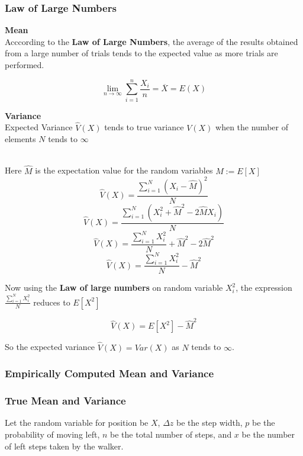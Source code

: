 \documentclass[a4paper]{article}
\begin{document}
\subsubsection{Law of Large Numbers}
\vspace{1em}
{\textbf{Mean}}\\
Acccording to the \textbf{Law of Large Numbers}, the average of the results obtained from a large number of trials tends to the expected value as more trials are performed.

$$\lim_{n \to \infty} \sum_{i=1}^{n} \frac{X_i}{n} = \overline{X} = E(X)$$

{\textbf{Variance}}\\
Expected Variance $\hat{V}(X)$ tends to true variance $V(X)$ when the number of elements $N$ tends to $\infty$ \\\

Here $\hat{M}$ is the expectation value for the random variables $M:= E[X]$\\

$$\hat{V}(X) = \frac{\sum_{i=1}^{N}(X_{i} - \hat{M})^2}{N}$$
$$\hat{V}(X) = \frac{\sum_{i=1}^{N}(X_{i}^2 + \hat{M}^2 - 2\hat{M}X_{i})}{N}$$
$$\hat{V}(X) = \frac{\sum_{i=1}^{N}X_{i}^2}{N} + \hat{M}^2 - 2\hat{M}^2$$
$$\hat{V}(X) = \frac{\sum_{i=1}^{N}X_{i}^2}{N}  - \hat{M}^2$$

Now using the \textbf{Law of large numbers} on random variable $X_{i}^2$, the expression 
$\frac{\sum_{i=1}^{N}X_{i}^2}{N}$ reduces to $E[X^2]$

$$\hat{V}(X) = E[X^2]  - \hat{M}^2$$


So the expected variance $\hat{V}(X) = Var(X)$ as $N$ tends to $\infty$.

\subsubsection{Empirically Computed Mean and Variance}
\vspace{1em}

\subsubsection{True Mean and Variance}

Let the random variable for position be $X$, $\Delta z$ be the step width, $p$ be the probability of moving left, $n$ be the total number of steps, and  $x$ be the number of left steps taken by the walker.\\
\end{document}
